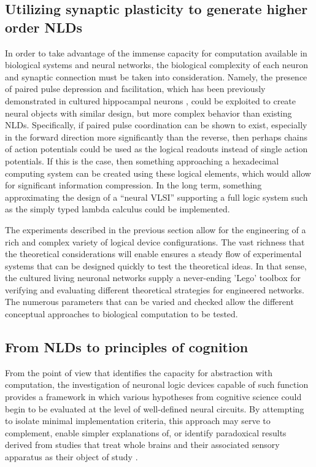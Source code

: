 \subsection{Utilizing synaptic plasticity to generate higher order NLDs}

 
In order to take advantage of the immense capacity for computation
available in biological systems and neural networks, the biological
complexity of each neuron and synaptic connection must be taken into
consideration. Namely, the presence of paired pulse depression and
facilitation, which has been previously demonstrated in cultured
hippocampal neurons \cite{Cummings1996}, could be exploited to create neural objects
with similar design, but more complex behavior than existing NLDs.
Specifically, if paired pulse coordination can be shown to exist,
especially in the forward direction more significantly than the reverse,
then perhaps chains of action potentials could be used as the logical
readouts instead of single action potentials. If this is the case, then
something approaching a hexadecimal computing system can be created
using these logical elements, which would allow for significant
information compression. In the long term, something approximating the
design of a ``neural VLSI'' supporting a full logic system such as the
simply typed lambda calculus could be implemented.

The experiments described in the previous section allow for the engineering of a rich and complex variety of logical device configurations. The vast richness that the theoretical considerations will enable ensures a steady flow of experimental systems that can be designed quickly to test the theoretical ideas. In that sense, the cultured living neuronal networks supply a never-ending 'Lego' toolbox for verifying and evaluating different theoretical strategies for engineered networks. The numerous parameters that can be varied and checked allow the different conceptual approaches to biological computation to be tested.  

\subsection{From NLDs to principles of cognition}

From the point of view that identifies the capacity for abstraction with
computation, the investigation of neuronal logic devices capable of such
function provides a framework in which various hypotheses from cognitive
science could begin to be evaluated at the level of well-defined neural
circuits. By attempting to isolate minimal implementation criteria, this
approach may serve to complement, enable simpler explanations of, or
identify paradoxical results derived from studies that treat whole
brains and their associated sensory apparatus as their object of study
\cite{McClelland2010,Griffiths2010}. 

